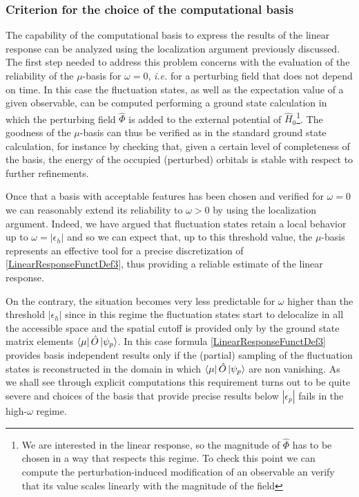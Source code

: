 \documentclass[a4paper]{article}
\newcommand{\eps}{\epsilon}
\newcommand{\op}[1]{\hat {#1}}
\newcommand{\hnot}{\op{H}_0}
\begin{document}
\subsubsection{Criterion for the choice of the computational basis}

The capability of the computational basis to express the results of the linear response can be analyzed using the localization argument previously discussed. 
The first step needed to address this problem concerns with the evaluation of the reliability of the $\mu$-basis for $\omega=0$, \emph{i.e.} for a perturbing field that does 
not depend on time. In this case the fluctuation states, as well as the expectation value of a given observable, can be computed performing a ground state calculation in which the perturbing 
field $\op\Phi$ is added to the external potential of $\hnot$\footnote{We are interested in the linear response, so the magnitude of $\op\Phi$ has to be chosen in a way that respects this 
regime. To check this point we can compute the perturbation-induced modification of an observable an verify that its value scales linearly with the magnitude of the field}. 
The goodness of the $\mu$-basis can thus be verified as in the standard ground state calculation, for instance by checking that, given a certain level of completeness of the basis,
the energy of the occupied (perturbed) orbitals is stable with respect to further refinements. 

Once that a basis with acceptable features has been chosen and verified for $\omega=0$ we can reasonably extend its reliability to $\omega>0$ by using the localization argument. 
Indeed, we have argued that fluctuation states retain a local behavior up to $\omega=|\eps_h|$ and so we can expect that, up to this threshold value, the $\mu$-basis represents an 
effective tool for a precise discretization of \eqref{LinearResponseFunctDef3}, thus providing a reliable estimate of the linear response.  

On the contrary, the situation becomes very less predictable for $\omega$ higher than the threshold $|\eps_h|$ since in this regime the fluctuation states start to delocalize in all the 
accessible space and the spatial cutoff is provided only by the ground state matrix elements $\bra{\mu}\op O\ket{\psi_p}$.  
In this case formula \eqref{LinearResponseFunctDef3} provides basis independent results only if the (partial) sampling of the fluctuation states is reconstructed in the domain in which
$\bra{\mu}\op O\ket{\psi_p}$ are non vanishing. As we shall see through explicit computations this requirement turns out to be quite severe and choices of the basis that provide precise
results below $|\eps_p|$ fails in the high-$\omega$ regime.  
\end{document}
